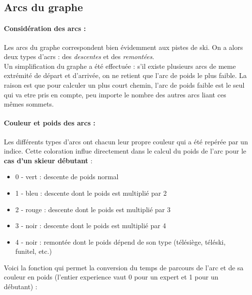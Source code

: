\documentclass[a4]{article}
\begin{document}
		\subsection{Arcs du graphe}
			\paragraph{Considération des arcs :\\}
			Les arcs du graphe correspondent bien évidemment aux pistes de ski. On a alors deux types d'acrs : des \textit{descentes} et des
			\textit{remontées}.\\
			Un simplification du graphe a été effectuée : s'il existe plusieurs arcs de meme extrémité de départ et d'arrivée, 
			on ne retient que l'arc de poids le plus faible. La raison est que pour calculer un plus court chemin, l'arc de poids faible est 
			le seul qui va etre pris en compte, peu importe le nombre des autres arcs liant ces mêmes sommets.
			\paragraph{Couleur et poids des arcs :\\}
			Les différents types d'arcs ont chacun leur propre couleur qui a été repérée par un indice. Cette coloration influe directement dans 
			le calcul du poids de l'arc pour le \textbf{cas d'un skieur débutant} :
			\begin{itemize}
			\item{0 - vert : descente de poids normal}
			\item{1 - bleu : descente dont le poids est multiplié par 2}
			\item{2 - rouge : descente dont le poids est multiplié par 3}
			\item{3 - noir : descente dont le poids est multiplié par 4}
			\item{4 - noir : remontée dont le poids dépend de son type (télésiège, téléski, funitel, etc.)}
			\end{itemize}
			Voici la fonction qui permet la conversion du temps de parcours de l'arc et de sa couleur en poids (l'entier experience vaut 0 pour un
			expert et 1 pour un débutant) :
			
			
\end{document}
